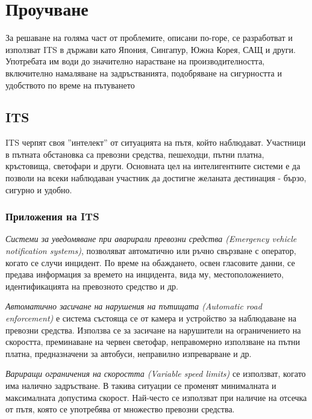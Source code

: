 \section{Проучване}

	За решаване на голяма част от проблемите, описани по-горе, се разработват и
	използват \ac{ITS} в държави като Япония, Сингапур, Южна Корея, САЩ и други.
	Употребата им води до значително нарастване на производителността, включително
	намаляване на задръстванията, подобряване на сигурността и удобството
	по време на пътуването \cite{Ezell}
	
	\subsection{\ac{ITS}}
	
	\ac{ITS} черпят своя ''интелект'' от ситуацията на пътя, който наблюдават. Участници в пътната
	обстановка са превозни средства, пешеходци, пътни платна, кръстовища, светофари и други.
	Основната цел на интелигентните системи е да позволи на всеки наблюдаван участник да
	достигне желаната дестинация - бързо, сигурно и удобно.
	
		\subsubsection{Приложения на \ac{ITS}}
		
			\emph{Системи за уведомяване при аварирали превозни средства (Emergency vehicle notification systems)},
			позволяват автоматично или ръчно свързване с оператор, когато се случи инцидент. По време
			на обаждането, освен гласовите данни, се предава информация за времето на инцидента, вида му,
			местоположението, идентификацията на превозното средство и др.
			
	    \emph{Автоматично засичане на нарушения на пътищата (Automatic road\\ enforcement)} е система състояща
	    се от камера и устройство за наблюдаване на превозни средства. Използва се за засичане
	    на нарушители на ограничението на скоростта, преминаване на червен светофар, неправомерно
	    използване на пътни платна, предназначени за автобуси, неправилно изпреварване и др.
	    
	    \emph{Вариращи ограничения на скоростта (Variable speed limits)} се използват, когато
	    има налично задръстване. В такива ситуации се променят минималната и максималната допустима скорост.
	    Най-често се използват при наличие на отсечка от пътя, която се употребява от множество превозни средства.
	    
